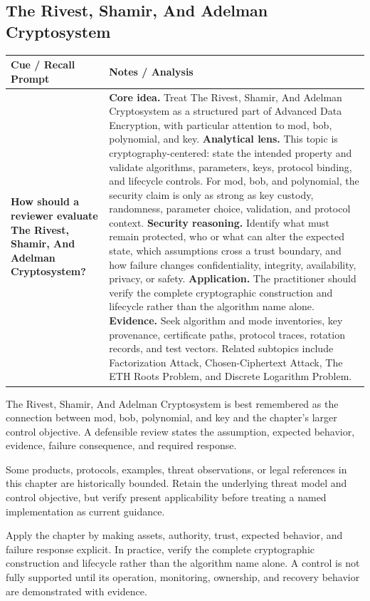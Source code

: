 \documentclass[11pt]{article}
\newcommand{\CornellHeader}{%
\rowcolor{Navy}\color{white}\bfseries Cue / Recall Prompt & \color{white}\bfseries Notes / Analysis\\\hline}
\newcommand{\CornellRow}[2]{%
\cellcolor{CueGray}\RaggedRight\textbf{#1} & \RaggedRight #2\\\hline}
\begin{document}
\subsection*{The Rivest, Shamir, And Adelman Cryptosystem}
\begin{longtable}{>{\RaggedRight\arraybackslash}p{}|>{\RaggedRight\arraybackslash}p{}}
\CornellHeader
\CornellRow{How should a reviewer evaluate The Rivest, Shamir, And Adelman Cryptosystem?}{\textbf{Core idea.} Treat The Rivest, Shamir, And Adelman Cryptosystem as a structured part of Advanced Data Encryption, with particular attention to mod, bob, polynomial, and key. \textbf{Analytical lens.} This topic is cryptography-centered: state the intended property and validate algorithms, parameters, keys, protocol binding, and lifecycle controls. For mod, bob, and polynomial, the security claim is only as strong as key custody, randomness, parameter choice, validation, and protocol context. \textbf{Security reasoning.} Identify what must remain protected, who or what can alter the expected state, which assumptions cross a trust boundary, and how failure changes confidentiality, integrity, availability, privacy, or safety. \textbf{Application.} The practitioner should verify the complete cryptographic construction and lifecycle rather than the algorithm name alone. \textbf{Evidence.} Seek algorithm and mode inventories, key provenance, certificate paths, protocol traces, rotation records, and test vectors. Related subtopics include Factorization Attack, Chosen-Ciphertext Attack, The ETH Roots Problem, and Discrete Logarithm Problem.}
\end{longtable}
\begin{topicsummary}
The Rivest, Shamir, And Adelman Cryptosystem is best remembered as the connection between mod, bob, polynomial, and key and the chapter's larger control objective. A defensible review states the assumption, expected behavior, evidence, failure consequence, and required response.
\end{topicsummary}
\begin{historybox}
Some products, protocols, examples, threat observations, or legal references in this chapter are historically bounded. Retain the underlying threat model and control objective, but verify present applicability before treating a named implementation as current guidance.
\end{historybox}
\begin{defensebox}
Apply the chapter by making assets, authority, trust, expected behavior, and failure response explicit. In practice, verify the complete cryptographic construction and lifecycle rather than the algorithm name alone. A control is not fully supported until its operation, monitoring, ownership, and recovery behavior are demonstrated with evidence.
\end{defensebox}
\end{document}
